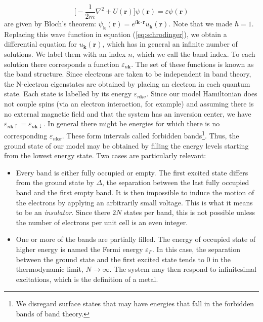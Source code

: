 \begin{equation}\label{eq:schrodinger}
\bigg[ -\frac{1}{2m} \nabla^2 + U(\bm r) \bigg] \psi (\bm r) = \varepsilon \psi (\bm r)
\end{equation}
are given by Bloch's theorem: $\psi_{\bm k} (\bm r) = e^{i\bm k \cdot \bm r} u_{\bm k} (\bm r)$.
Note that we made $\hbar = 1$.
Replacing this wave function in equation (\ref{eq:schrodinger}), we obtain a differential equation for $u_{\bm k} (\bm r)$, which has in general an infinite number of solutions.
We label them with an index $n$, which we call the band index.
To each solution there corresponds a function $\varepsilon_{n\bm k}$.
The set of these functions is known as the band structure.
Since electrons are taken to be independent in band theory, the N-electron eigenstates are obtained by placing an electron in each quantum state.
Each state is labelled by its energy $\varepsilon_{n\bm k \sigma}$.
Since our model Hamiltonian does not couple spins (via an electron interaction, for example) and assuming there is no external magnetic field and that the system has an inversion center, we have $\varepsilon_{n\bm k \uparrow} = \varepsilon_{n\bm k \downarrow}$.
In general there might be energies for which there is no corresponding $\varepsilon_{n\bm k \sigma}$.
These form intervals called forbidden bands\footnote{We disregard surface states that may have energies that fall in the forbidden bands of band theory.}.
Thus, the ground state of our model may be obtained by filling the energy levels starting from the lowest energy state.
Two cases are particularly relevant:
\begin{itemize}
\item Every band is either fully occupied or empty.
The first excited state differs from the ground state by $\Delta$, the separation between the last fully occupied band and the first empty band.
It is then impossible to induce the motion of the electrons by applying an arbitrarily small voltage.
This is what it means to be an \emph{insulator}.
Since there $2N$ states per band, this is not possible unless the number of electrons per unit cell is an even integer.
\item One or more of the bands are partially filled.
The energy of occupied state of higher energy is named the Fermi energy $\varepsilon_F$.
In this case, the separation between the ground state and the first excited state tends to $0$ in the thermodynamic limit, $N \rightarrow \infty$.
The system may then respond to infinitesimal excitations, which is the definition of a metal.
\end{itemize}

